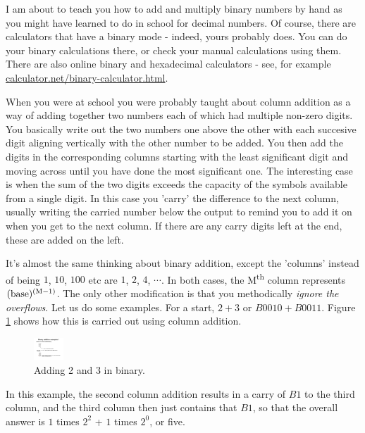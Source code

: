 \documentclass[../physical_computing.tex]{subfiles}
\begin{document}
I am about to teach you how to add and multiply binary numbers by hand as you might have learned to do in school for decimal numbers. Of course, there are calculators that have a binary mode - indeed, yours probably does. You can do your binary calculations there, or check your manual calculations using them. There are also online binary and hexadecimal calculators - see, for example \url{calculator.net/binary-calculator.html}.

When you were at school you were probably taught about column addition as a way of adding together two numbers each of which had multiple non-zero digits. You basically write out the two numbers one above the other with each succesive digit aligning vertically with the other number to be added. You then add the digits in the corresponding columns starting with the least significant digit and moving across until you have done the most significant one. The interesting case is when the sum of the two digits exceeds the capacity of the symbols available from a single digit. In this case you 'carry' the difference to the next column, usually writing the carried number below the output to remind you to add it on when you get to the next column. If there are any carry digits left at the end, these are added on the left. 

It's almost the same thinking about binary addition, except the 'columns' instead of being $1$, $10$, $100$ etc are $1$, $2$, $4$, $\cdots$. In both cases, the M\textsuperscript{th} column represents $\rm (base)^{(M-1)}$. The only other modification is that you methodically {\it ignore the overflows}. Let us do some examples. For a start, $2+3$ or $B0010+B0011$. Figure \ref{fig:addition_example_1} shows how this is carried out using column addition.
\begin{figure}[h!]
    \centering
    \includegraphics[width=0.1\textwidth]{figures/addition_example_1.pdf}
    \caption{Adding 2 and 3 in binary.}
    \label{fig:addition_example_1}
\end{figure}
In this example, the second column addition results in a carry of $B1$ to the third column, and the third column then just contains that $B1$, so that the overall answer is $1$ times $2^2$ + $1$ times $2^0$, or five.
\end{document}
